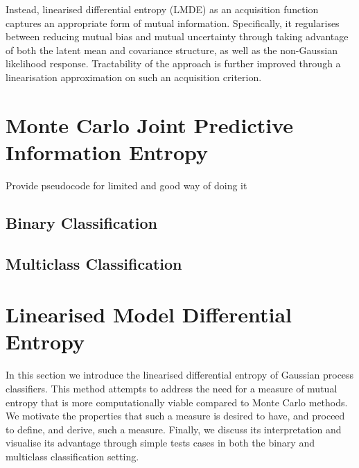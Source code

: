 		Instead, linearised differential entropy (LMDE) as an acquisition function captures an appropriate form of mutual information. Specifically, it regularises between reducing mutual bias and mutual uncertainty through taking advantage of both the latent mean and covariance structure, as well as the non-Gaussian likelihood response. Tractability of the approach is further improved through a linearisation approximation on such an acquisition criterion.
		
		
%		
%			
%		
		
	\section{Monte Carlo Joint Predictive Information Entropy}
	\label{Informative-Seafloor-Exploration:MCJPIE}
			Provide pseudocode for limited and good way of doing it
			
		\subsection{Binary Classification}
		
		\subsection{Multiclass Classification}
		
	\section{Linearised Model Differential Entropy}
	\label{Informative-Seafloor-Exploration:LMDE}
	
		In this section we introduce the linearised differential entropy of Gaussian process classifiers. This method attempts to address the need for a measure of mutual entropy that is more computationally viable compared to Monte Carlo methods. We motivate the properties that such a measure is desired to have, and proceed to define, and derive, such a measure. Finally, we discuss its interpretation and visualise its advantage through simple tests cases in both the binary and multiclass classification setting.
		
